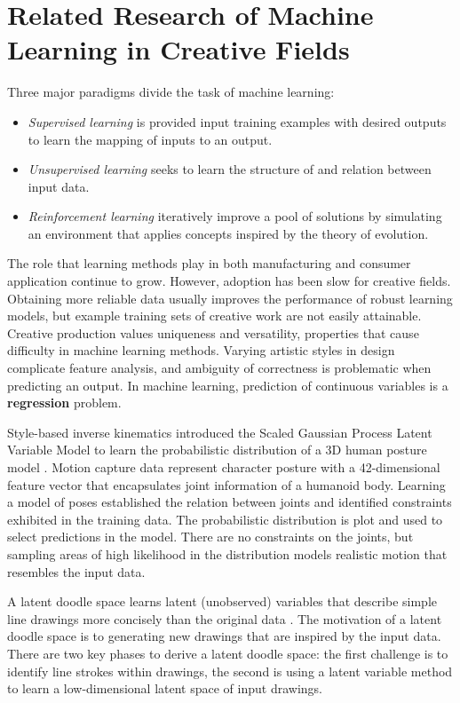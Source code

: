 \documentclass[ %
author={Dillon Keith Diep},
supervisor={Dr. Carl Henrik Ek},
degree={MEng},
title={ART-CG Hair:},
subtitle={Assisted Real-time Content Generation of Stylised Virtual Hair},
type={Research},
year={2017} ]{dissertation}
\begin{document}
\section{Related Research of Machine Learning in Creative Fields}
Three major paradigms divide the task of machine learning:
\begin{itemize}
	\item \textit{Supervised learning} is provided input training examples with desired outputs to learn the mapping of inputs to an output.
	\item \textit{Unsupervised learning} seeks to learn the structure of and relation between input data.
	\item \textit{Reinforcement learning} iteratively improve a pool of solutions by simulating an environment that applies concepts inspired by the theory of evolution.
\end{itemize}
The role that learning methods play in both manufacturing and consumer application continue to grow. However, adoption has been slow for creative fields.  Obtaining more reliable data usually improves the performance of robust learning models, but example training sets of creative work are not easily attainable. Creative production values uniqueness and versatility, properties that cause difficulty in machine learning methods. Varying artistic styles in design complicate feature analysis, and ambiguity of correctness is problematic when predicting an output. In machine learning, prediction of continuous variables is a \textbf{regression} problem. 

Style-based inverse kinematics introduced the Scaled Gaussian Process Latent Variable Model to learn the probabilistic distribution of a 3D human posture model \cite{styleik}.  Motion capture data represent character posture with a 42-dimensional feature vector that encapsulates joint information of a humanoid body. Learning a model of poses established the relation between joints and identified constraints exhibited in the training data.  The probabilistic distribution is plot and used to select predictions in the model. There are no constraints on the joints, but sampling areas of high likelihood in the distribution models realistic motion that resembles the input data.

A latent doodle space learns latent (unobserved) variables that describe simple line drawings more concisely than the original data \cite{latentdoodle}. The motivation of a latent doodle space is to generating new drawings that are inspired by the input data. There are two key phases to derive a latent doodle space: the first challenge is to identify line strokes within drawings, the second is using a latent variable method to learn a low-dimensional latent space of input drawings.
\end{document}
